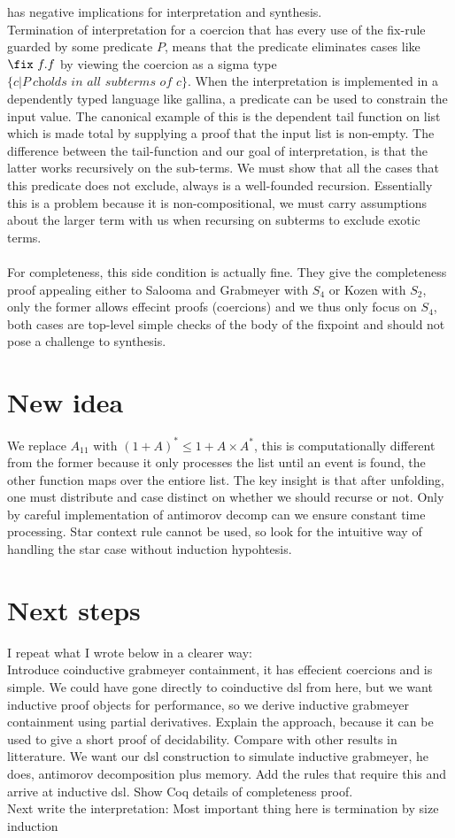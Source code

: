   has negative implications for interpretation and synthesis. \\
Termination of interpretation for a coercion that has every use of the fix-rule guarded by some predicate $P$, means that the predicate eliminates cases like $\fix ~f.f$ by viewing the coercion as a sigma type $\{c | P~c \textit{holds in all subterms of } c\}$. 
When the interpretation is implemented in a dependently typed language like gallina, a predicate can be used to constrain the input value. The canonical example of this is the dependent tail function on list which is made total by supplying a proof that the input list is non-empty. The difference between the tail-function and our goal of interpretation, is that the latter works recursively on the sub-terms. We must show that all the cases that this predicate does not exclude, always is a well-founded recursion. Essentially this is a problem because it is non-compositional, we must carry assumptions about the larger term with us when recursing on subterms to exclude exotic terms.\\\\
For completeness, this side condition is actually fine. They give the completeness proof appealing either to Salooma and Grabmeyer with $S_4$ or Kozen with $S_2$, only the former allows effecint proofs (coercions) and we thus only focus on $S_4$, both cases  are top-level simple checks of the body of the fixpoint and should not pose a challenge to synthesis.
\section{New idea}
We replace $A_{11}$ with $(1 + A)^* \leq 1 + A \times A^*$, this is computationally different from the former because it only processes the list until an event is found, the other function maps over the entiore list. The key insight is that after unfolding, one must distribute and case distinct on whether we should recurse or not. Only by careful implementation of antimorov decomp can we ensure constant time processing. Star context rule cannot be used, so look for the intuitive way of handling the star case without induction hypohtesis.
\section{Next steps}
I repeat what I wrote below in a clearer way:\\
Introduce coinductive grabmeyer containment, it has effecient coercions and is simple. We could have gone directly to coinductive dsl from here, but we want inductive proof objects for performance, so we derive inductive grabmeyer containment using partial derivatives. Explain the approach, because it can be used to give a short proof of decidability. Compare with other results in litterature. We want our dsl construction to simulate inductive grabmeyer, he does, antimorov decomposition plus memory. Add the rules that require this and arrive at inductive dsl. Show Coq details of completeness proof.\\
Next write the interpretation: Most important thing here is termination by size induction\\

